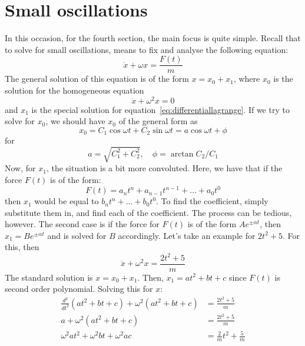 \section{Small oscillations}
In this occasion, for the fourth section, the main focus is quite simple. Recall that to solve for small oscillations, means to fix and analyse the following equation: 
\begin{equation}
    \ddot{x} + \omega x = \frac{F(t)}{m}
    \label{eq:differentiallagrange}
\end{equation}
The general solution of this equation is of the form $x=x_{0}+x_{1}$, where $x_{0}$ is the solution for the homogeneous equation
\begin{equation}
    \ddot{x} + \omega^{2} x = 0
\end{equation}
and $x_{1}$ is the special solution for equation~\ref{eq:differentiallagrange}. If we try to solve for $x_{0}$, we should have $x_{0}$ of the general form as 
\begin{equation}
    x_{0} = C_{1}\cos{\omega t} + C_{2}\sin{\omega t} = a\cos{\omega t + \phi}
\end{equation}
for 
\begin{equation}
    a = \sqrt{C_{1}^{2} + C_{2}^{2}}, \quad \phi = \arctan{C_{2}/C_{1}}
\end{equation}
Now, for $x_{1}$, the situation is a bit more convoluted. Here, we have that if the force $F(t)$ is of the form: 
\begin{equation}
    F(t) = a_{n}t^{n} + a_{n-1}t^{n-1}+\dots+ a_{0}t^{0}
\end{equation}
then $x_{1}$ would be equal to $b_{n}t^{n}+\dots+b_{0}t^{0}$. To find the coefficient, simply substitute them in, and find each of the coefficient. The process can be tedious, however. The second case is if the force for $F(t)$ is of the form $Ae^{\pm\alpha t}$, then $x_{1}=Be^{\pm\alpha t}$ and is solved for $B$ accordingly. Let's take an example for $2t^{2}+5$. For this, then 
\begin{equation}
    \ddot{x} + \omega^{2}x = \frac{2t^2+5}{m}
\end{equation}
The standard solution is $x=x_{0}+x_{1}$. Then, $x_{1}=at^{2}+bt+c$ since $F(t)$ is second order polynomial. Solving this for $x$: 
\begin{align}
    \frac{d^{2}}{dt^{2}} (at^{2}+bt+c) + \omega^{2}(at^{2}+bt+c) &= \frac{2t^{2}+5}{m}\\
    a + \omega^{2}(at^{2}+bt+c) & = \frac{2t^{2}+5}{m}\\
    \omega^{2}a t^{2} + \omega^{2}bt + \omega^{2}ac & = \frac{2}{m}t^{2}+\frac{5}{m}\\ 
\end{align}
